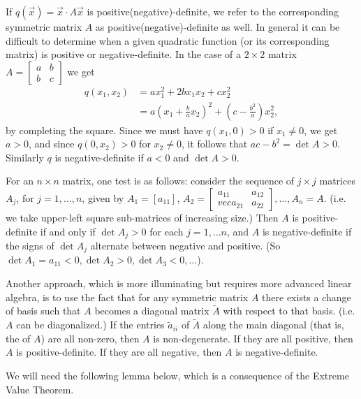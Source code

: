 If $q(\vec{x}) = \vec{x}\cdot A\vec{x}$ is positive(negative)-definite, we refer to the corresponding symmetric matrix $A$ as positive(negative)-definite as well. In general it can be difficult to determine when a given quadratic function (or its corresponding matrix) is positive or negative-definite. In the case of a $2\times 2$ matrix $A = \begin{bmatrix} a&b\\b&c\end{bmatrix}$ we get
\begin{align*}
q(x_1,x_2)&= ax_1^2+2bx_1x_2+cx_2^2\\
&=a\left(x_1+\frac{b}{a}x_2\right)^2+\left(c-\frac{b^2}{a}\right)x_2^2,
\end{align*}
by completing the square. Since we must have $q(x_1,0)>0$ if $x_1\neq 0$, we get $a>0$, and since $q(0,x_2)>0$ for $x_2\neq 0$, it follows that $ac-b^2=\det A >0$. Similarly $q$ is negative-definite if $a<0$ and $\det A>0$.

For an $n\times n$ matrix, one test is as follows: consider the sequence of $j\times j$ matrices $A_j$, for $j=1,\ldots , n$, given by  $A_1=[a_{11}]$, $A_2 = \begin{bmatrix} a_{11}&a_{12}\\vec{a}_{21}&a_{22}\end{bmatrix},\ldots, A_n=A$. (i.e. we take upper-left square sub-matrices of increasing size.) Then $A$ is positive-definite if and only if $\det A_j>0$ for each $j=1,\ldots n$, and $A$ is negative-definite if the signs of $\det A_j$ alternate between negative and positive. (So $\det A_1 = a_{11}<0, \det A_2>0, \det A_3<0,\ldots$).

Another approach, which is more illuminating but requires more advanced linear algebra, is to use the fact that for any symmetric matrix $A$ there exists a change of basis such that $A$ becomes a diagonal matrix $\tilde{A}$ with respect to that basis. (i.e. $A$ can be diagonalized.) If the entries $\tilde{a}_{ii}$ of $\tilde{A}$ along the main diagonal (that is, the  of $A$) are all non-zero, then $A$ is non-degenerate. If they are all positive, then $A$ is positive-definite. If they are all negative, then $A$ is negative-definite.

We will need the following lemma below, which is a consequence of the Extreme Value Theorem.


